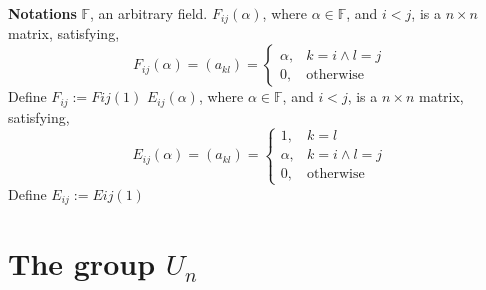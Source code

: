\documentclass[12pt]{article}
\begin{document}
\textbf{Notations}\newline
\textbf{$\mathbb{F}$}, an arbitrary field. \newline
\textbf{$F_{ij}(\alpha)$}, where $\alpha \in \mathbb{F}$, and $i<j$, is a $n \times n$ matrix, satisfying, 
$$
F_{ij}(\alpha)=(a_{kl})=\begin{cases}
			\alpha, & k=i \land l=j\\
            0, & \text{otherwise}
		 \end{cases}
$$
Define $F_{ij}:=F{ij}(1)$ \newline
\textbf{$E_{ij}(\alpha)$}, where $\alpha \in \mathbb{F}$, and $i<j$, is a $n \times n$ matrix, satisfying, 
$$
E_{ij}(\alpha)=(a_{kl})=\begin{cases}
            1, & k=l\\
			\alpha, & k=i \land l=j\\
            0, & \text{otherwise}
		 \end{cases}
$$
Define $E_{ij}:=E{ij}(1)$ \newline

\section{The group $U_n$}
\end{document}
